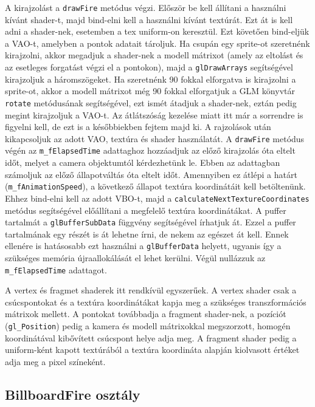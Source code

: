 A kirajzolást a \texttt{drawFire} metódus végzi. Először be kell állítani a használni kívánt shader-t, majd bind-elni kell a használni kívánt textúrát. Ezt át is kell adni a shader-nek, esetemben a tex uniform-on keresztül. Ezt követően bind-eljük a VAO-t, amelyben a pontok adatait tároljuk. Ha csupán egy sprite-ot szeretnénk kirajzolni, akkor megadjuk a shader-nek a modell mátrixot (amely az eltolást és az esetleges forgatást végzi el a pontokon), majd a \texttt{glDrawArrays} segítségével kirajzoljuk a háromszögeket. Ha szeretnénk 90 fokkal elforgatva is kirajzolni a sprite-ot, akkor a modell mátrixot még 90 fokkal elforgatjuk a GLM könyvtár \texttt{rotate} metódusának segítségével, ezt ismét átadjuk a shader-nek, eztán pedig megint kirajzoljuk a VAO-t. Az átlátszóság kezelése miatt itt már a sorrendre is figyelni kell, de ezt is a későbbiekben fejtem majd ki. A rajzolások után kikapcsoljuk az adott VAO, textúra és shader használatát. A \texttt{drawFire} metódus végén az \texttt{m\_fElapsedTime} adattaghoz hozzáadjuk az előző kirajzolás óta eltelt időt, melyet a camera objektumtól kérdezhetünk le. Ebben az adattagban számoljuk az előző állapotváltás óta eltelt időt. Amennyiben ez átlépi a határt (\texttt{m\_fAnimationSpeed}), a következő állapot textúra koordinátáit kell betöltenünk. Ehhez bind-elni kell az adott VBO-t, majd a \texttt{calculateNextTextureCoordinates} metódus segítségével előállítani a megfelelő textúra koordinátákat. A puffer tartalmát a \texttt{glBufferSubData} függvény segítségével írhatjuk át. Ezzel a puffer tartalmának egy részét is át lehetne írni, de nekem az egészet át kell. Ennek ellenére is hatásosabb ezt használni a \texttt{glBufferData} helyett, ugyanis így a szükséges memória újraallokálását el lehet kerülni. Végül nullázzuk az \texttt{m\_fElapsedTime} adattagot.

A vertex és fragmet shaderek itt rendkívül egyszerűek. A vertex shader csak a csúcspontokat és a textúra koordinátákat kapja meg a szükséges transzformációs mátrixok mellett. A pontokat továbbadja a fragment shader-nek, a pozíciót (\texttt{gl\_Position}) pedig a kamera és modell mátrixokkal megszorzott, homogén koordinátával kibővített csúcspont helye adja meg. A fragment shader pedig a uniform-ként kapott textúrából a textúra koordináta alapján kiolvasott értéket adja meg a pixel színeként. 


\subsection{BillboardFire osztály}

